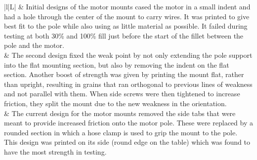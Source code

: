 \begin{table}[!htbp]
	\centering
	\caption{Modelling iterations for motor mounts}
	\begin{tabulary}{\textwidth}{|l|L|}
		\hline 
		\centering
		 &
		\vspace{40pt} Initial designs of the motor mounts cased the motor in a small indent and had a hole through the center of the mount to carry wires. It was printed to give best fit to the pole while also using as little material as possible.
		It failed during testing at both 30\% and 100\% fill just before the start of the fillet between the pole and the motor. \\ 
		\hline 
		\centering
		 &
		\vspace{40pt} The second design fixed the weak point by not only extending the pole support into the flat mounting section, but also by removing the indent on the flat section.
		Another boost of strength was given by printing the mount flat, rather than upright, resulting in grains that ran orthogonal to previous lines of weakness and not parallel with them.
		When side screws were then tightened to increase friction, they split the mount due to the new weakness in the orientation. \\ 
		\hline 
		\centering
		 &
		\vspace{40pt} The current design for the motor mounts removed the side tabs that were meant to provide increased friction onto the motor pole. These were replaced by a rounded section in which a hose clamp is used to grip the mount to the pole. This design was printed on its side (round edge on the table) which was found to have the most strength in testing.\\ 
		\hline
	\end{tabulary} 
	\label{tab:3D_motor}
\end{table}

\newpage

